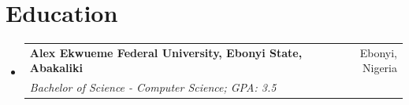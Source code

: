\documentclass[a4paper, 20pt]{article}
\makeatletter
\newcommand{\resumeSubheading}[4]{
\vspace{-1pt}
\item[]
\begin{tabular*}{0.97\textwidth}{l@{\extracolsep{\fill}}r}
	\textbf{#1} & #2          \\
	\textit{#3} & \textit{#4} \\
\end{tabular*}
\vspace{1pt}
}
\newcommand{\resumeSubHeadingListStart}{\begin{itemize}[leftmargin=*,topsep=2pt]}
\newcommand{\resumeSubHeadingListEnd}{\end{itemize}}
\makeatother
\begin{document}
	\vspace{-5pt}
	\section{Education}
	\resumeSubHeadingListStart
	\resumeSubheading
	{Alex Ekwueme Federal University, Ebonyi State, Abakaliki}{Ebonyi, Nigeria}
	{Bachelor of Science - Computer Science; GPA: 3.5}{}
	\resumeSubHeadingListEnd
\end{document}
